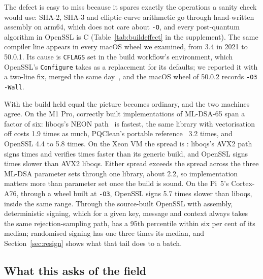 The defect is easy to miss because it spares exactly the operations a sanity
check would use: SHA-2, SHA-3 and elliptic-curve arithmetic go through
hand-written assembly on arm64, which does not care about \texttt{-O}, and
every post-quantum algorithm in OpenSSL is C (Table~\ref{tab:buildeffect} in
the supplement). The same compiler line appears in every macOS wheel we
examined, from 3.4 in 2021 to 50.0.1. Its cause is \texttt{CFLAGS} set in the
build workflow's environment, which OpenSSL's \texttt{Configure} takes as a
replacement for its defaults; we reported it with a two-line fix, merged the
same day~\cite{pyca_issue15702,pyca_infra796}, and the macOS wheel of 50.0.2
records \texttt{-O3 -Wall}.

With the build held equal the picture becomes ordinary, and the two machines
agree. On the M1 Pro, correctly built implementations of ML-DSA-65 span a
factor of six: liboqs's NEON path~\cite{becker2022neon} is fastest, the same
library with vectorisation off costs 1.9 times as much, PQClean's portable
reference~\cite{kannwischer2022pqclean} 3.2 times, and OpenSSL 4.4 to 5.8
times. On the Xeon VM the spread is \NxSpread: liboqs's AVX2 path signs
\NavxSign{} times and verifies \NavxVerify{} times faster than its generic
build, and OpenSSL signs \NxOsslVsOqs{} times slower than AVX2 liboqs. Either
spread exceeds the spread across the three ML-DSA parameter sets through one
library, about 2.2, so implementation matters more than parameter set once the
build is sound. On the Pi~5's Cortex-A76, through a wheel built at
\texttt{-O3}, OpenSSL signs 5.7 times slower than liboqs, inside the same
range. Through the source-built OpenSSL with assembly, deterministic signing, which for a given key, message and context always takes the same rejection-sampling path, has a 95th percentile within six per cent of its median; randomised signing has one
three times its median, and Section~\ref{sec:resign} shows what that tail
does to a batch.

\subsection{What this asks of the field}
\label{sec:audit}


